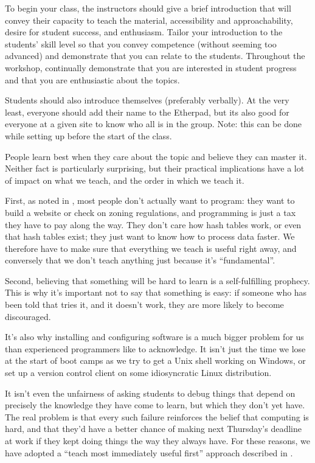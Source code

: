 
To begin your class, the instructors should give a brief introduction
that will convey their capacity to teach the material,
accessibility and approachability, desire for student success, and
enthusiasm. Tailor your introduction to the students' skill level so
that you convey competence (without seeming too advanced) and
demonstrate that you can relate to the students. Throughout the
workshop, continually demonstrate that you are interested in student
progress and that you are enthusiastic about the topics.

Students should also introduce themselves (preferably verbally). At the
very least, everyone should add their name to the Etherpad, but its also
good for everyone at a given site to know who all is in the group. Note:
this can be done while setting up before the start of the class.


People learn best when they care about the topic and believe they can
master it. Neither fact is particularly surprising, but their
practical implications have a lot of impact on what we teach, and the
order in which we teach it.

First, as noted in , most people don't
actually want to program: they want to build a website or check on
zoning regulations, and programming is just a tax they have to pay
along the way. They don't care how hash tables work, or even that hash
tables exist; they just want to know how to process data faster. We
therefore have to make sure that everything we teach is useful right
away, and conversely that we don't teach anything just because it's
``fundamental''.

Second, believing that something will be hard to learn is a
self-fulfilling prophecy. This is why it's important not to say that
something is easy: if someone who has been told that tries it, and it
doesn't work, they are more likely to become discouraged.

It's also why installing and configuring software is a much bigger
problem for us than experienced programmers like to acknowledge. It
isn't just the time we lose at the start of boot camps as we try to
get a Unix shell working on Windows, or set up a version control
client on some idiosyncratic Linux distribution.

It isn't even the unfairness of asking students to debug things that
depend on precisely the knowledge they have come to learn, but which
they don't yet have. The real problem is that every such failure
reinforces the belief that computing is hard, and that they'd have a
better chance of making next Thursday's deadline at work if they kept
doing things the way they always have. For these reasons, we have
adopted a ``teach most immediately useful first'' approach described
in .

